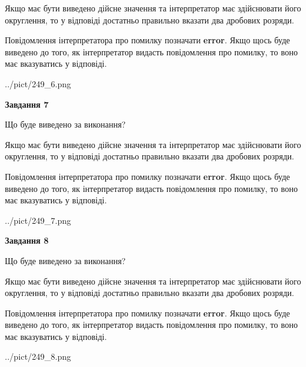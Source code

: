 \documentclass[12pt, ukrainian]{article}
\begin{document}
{\begin {Large}
Якщо має бути виведено дійсне значення та інтерпретатор має здійснювати його округлення, 
то у відповіді достатньо правильно вказати два дробових розряди.

Повідомлення інтерпретатора про помилку позначати \textbf{error}.
Якщо щось буде виведено до того, як інтерпретатор видасть повідомлення про помилку, 
то воно має вказуватись у відповіді. \par

\begin{center}
	{../pict/249_6.png}
\end{center}
\newpage

{\begin {center}\textbf{Завдання 7}\end {center}}\par
Що буде виведено за виконання? \par

Якщо має бути виведено дійсне значення та інтерпретатор має здійснювати його округлення, 
то у відповіді достатньо правильно вказати два дробових розряди.

Повідомлення інтерпретатора про помилку позначати \textbf{error}.
Якщо щось буде виведено до того, як інтерпретатор видасть повідомлення про помилку, 
то воно має вказуватись у відповіді. \par

\begin{center}
	{../pict/249_7.png}
\end{center}
\newpage

{\begin {center}\textbf{Завдання 8}\end {center}}\par
Що буде виведено за виконання? \par

Якщо має бути виведено дійсне значення та інтерпретатор має здійснювати його округлення, 
то у відповіді достатньо правильно вказати два дробових розряди.

Повідомлення інтерпретатора про помилку позначати \textbf{error}.
Якщо щось буде виведено до того, як інтерпретатор видасть повідомлення про помилку, 
то воно має вказуватись у відповіді. \par

\begin{center}
	{../pict/249_8.png}
\end{center}
\newpage


\end{Large}}
\end{document}

